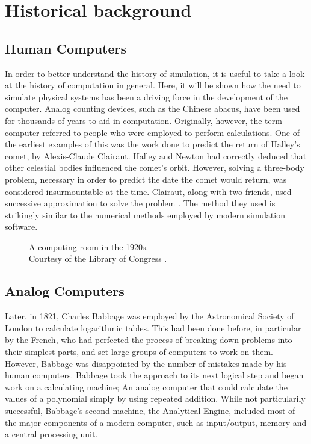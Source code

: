 \documentclass[\rootfolder/main.tex]{subfiles}
\begin{document}
\chapter{Historical background} %

\label{Chapter01} %

\section{Human Computers}

In order to better understand the history of simulation, it is useful to take a look at the history of computation in general.
Here, it will be shown how the need to simulate physical systems has been a driving force in the development of the computer.
Analog counting devices, such as the Chinese abacus, have been used for thousands of years to aid in computation.
Originally, however, the term computer referred to people who were employed to perform calculations.
One of the earliest examples of this was the work done to predict the return of Halley's comet, by Alexis-Claude Clairaut.
Halley and Newton had correctly deduced that other celestial bodies influenced the comet's orbit.
However, solving a three-body problem, necessary in order to predict the date the comet would return, was considered insurmountable at the time.
Clairaut, along with two friends, used successive approximation to solve the problem \cite{wilson1993}.
The method they used is strikingly similar to the numerical methods employed by modern simulation software.

\begin{wrapfigure}{R}{0.6\columnwidth}
    \caption[A computing room in the 1920s.]
            {A computing room in the 1920s. \\ Courtesy of the Library of Congress \label{fig:tabulatingroom}.}
\end{wrapfigure}

\section{Analog Computers}

Later, in 1821, Charles Babbage was employed by the Astronomical Society of London to calculate logarithmic tables.
This had been done before, in particular by the French, who had perfected the process of breaking down problems into their simplest parts, and set large groups of computers to work on them.
However, Babbage was disappointed by the number of mistakes made by his human computers.
Babbage took the approach to its next logical step and began work on a calculating machine; An analog computer that could calculate the values of a polynomial simply by using repeated addition.
While not particularily successful, Babbage's second machine, the Analytical Engine, included most of the major components of a modern computer, such as input/output, memory and a central processing unit.
\end{document}
